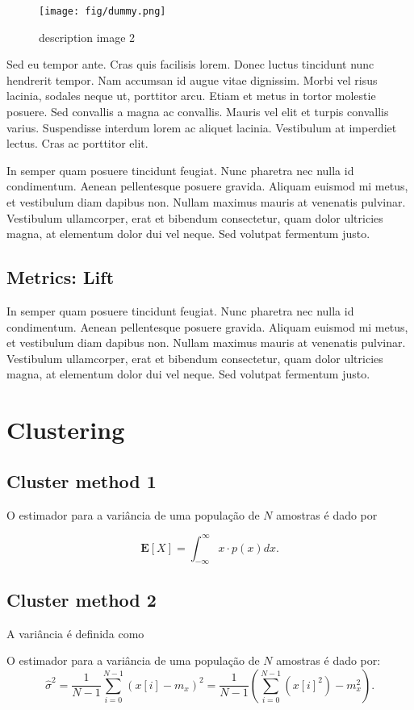 \begin{figure}
       \centering
       \texttt{[image: fig/dummy.png]}
       \caption{description image 2}
       \label{image2}
\end{figure}

Sed eu tempor ante. Cras quis facilisis lorem. Donec luctus tincidunt nunc hendrerit tempor. Nam accumsan id augue vitae dignissim. Morbi vel risus lacinia, sodales neque ut, porttitor arcu. Etiam et metus in tortor molestie posuere. Sed convallis a magna ac convallis. Mauris vel elit et turpis convallis varius. Suspendisse interdum lorem ac aliquet lacinia. Vestibulum at imperdiet lectus. Cras ac porttitor elit.

In semper quam posuere tincidunt feugiat. Nunc pharetra nec nulla id condimentum. Aenean pellentesque posuere gravida. Aliquam euismod mi metus, et vestibulum diam dapibus non. Nullam maximus mauris at venenatis pulvinar. Vestibulum ullamcorper, erat et bibendum consectetur, quam dolor ultricies magna, at elementum dolor dui vel neque. Sed volutpat fermentum justo. 


\subsection{Metrics: Lift}

In semper quam posuere tincidunt feugiat. Nunc pharetra nec nulla id condimentum. Aenean pellentesque posuere gravida. Aliquam euismod mi metus, et vestibulum diam dapibus non. Nullam maximus mauris at venenatis pulvinar. Vestibulum ullamcorper, erat et bibendum consectetur, quam dolor ultricies magna, at elementum dolor dui vel neque. Sed volutpat fermentum justo. 

\section{Clustering}

\subsection{Cluster method 1}

O estimador para a variância de uma população de $N$ amostras é dado por

\begin{equation}
	\mathbf{E}[X] = \int_{-\infty}^{\infty} x \cdot p(x) dx.
\end{equation}

\subsection{Cluster method 2}

A variância é definida como

O estimador para a variância de uma população de $N$ amostras é dado por:
\begin{equation}
\hat{\sigma}^2 = \frac{1}{N-1}\sum_{i=0}^{N-1}(x[i] - m_x)^2 = \frac{1}{N-1}\left(\sum_{i=0}^{N-1}(x[i]^2) - m_x^2\right).
\end{equation}


